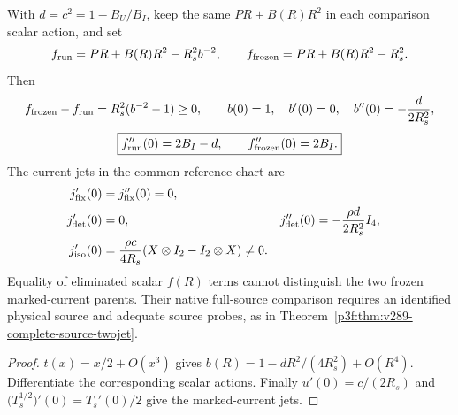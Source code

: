 \documentclass[12pt,a4paper]{article}
\begin{document}
\begin{corollary}
\label{p3e:cor:v3028-marked-source-jets}
With $d=c^2=1-B_U/B_I$, keep the same $PR+B(R)R^2$ in each
comparison scalar action, and set
\[
 f_{\rm run}=PR+B(R)R^2-R_s^2b^{-2},\qquad
 f_{\rm frozen}=PR+B(R)R^2-R_s^2.
\]
Then
\[
 f_{\rm frozen}-f_{\rm run}=R_s^2(b^{-2}-1)\ge0,
 \qquad b(0)=1,\quad b'(0)=0,\quad
 b''(0)=-\frac{d}{2R_s^2},
\]
\[
 \boxed{f_{\rm run}''(0)=2B_I-d,\qquad
        f_{\rm frozen}''(0)=2B_I.}
\]
The current jets in the common reference chart are
\[
\begin{aligned}
 j_{\rm fix}'(0)&=j_{\rm fix}''(0)=0,\\
 j_{\rm det}'(0)&=0, &
 j_{\rm det}''(0)&=-\frac{\rho d}{2R_s^2}I_4,\\
 j_{\rm iso}'(0)&=\frac{\rho c}{4R_s}
       (X\otimes I_2-I_2\otimes X)\ne0.
\end{aligned}
\]
Equality of eliminated scalar $f(R)$ terms cannot distinguish the
two frozen marked-current parents.  Their native full-source
comparison requires an identified physical source and adequate
source probes, as in
Theorem~\ref{p3f:thm:v289-complete-source-twojet}.
\end{corollary}
\begin{proof}
$t(x)=x/2+O(x^3)$ gives
$b(R)=1-dR^2/(4R_s^2)+O(R^4)$.  Differentiate the
corresponding scalar actions.  Finally
$u'(0)=c/(2R_s)$ and
$\bigl(T_s^{1/2}\bigr)'(0)=T_s'(0)/2$ give the
marked-current jets.
\end{proof}
\end{document}
